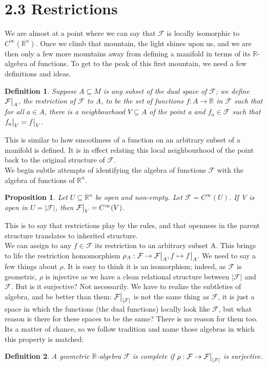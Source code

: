 \documentclass[12pt]{extarticle}
\newcommand\Reals{{\mathbb{R}}}
\newcommand{\ff}{\mathcal{F}}
\newcommand\restr[2]{{%
  \left.\kern-\nulldelimiterspace %
  #1 %
  \vphantom{\big|} %
  \right|_{#2} %
  }}
\newtheorem{definition}{Definition}
\newtheorem{proposition}[theorem]{Proposition}
\begin{document}
\section*{2.3 Restrictions}
We are almost at a point where we can say that $\ff$ is locally isomorphic to $C^\infty(\Reals^n)$. Once we climb that mountain, the light shines upon us, and we are then only a few more mountains away from defining a manifold in terms of its $\Reals$-algebra of functions. To get to the peak of this first mountain, we need a few definitions and ideas.
\begin{definition}
Suppose $A\subseteq M$ is any subset of the dual space of $\ff$;  we define
$\restr{\ff}{A}$, the \textit{restriction} of $\ff$ to A, to be the set of functions $f:A\to\Reals$ in $\ff$ such that for all $a\in A$, there is a neighbourhood $V\subseteq A$ of the point a and $f_a\in\ff$ such that $\restr{f_a}{V}=\restr{f}{V}$.
\end{definition}
This is similar to how smoothness of a function on an arbitrary subset of a manifold is defined. It is in effect relating this local neighbourhood of the point back to the original structure of $\ff$.\\
We begin subtle attempts of identifying the algebra of functions $\ff$ with the algebra of functions of $\Reals^n$.
\begin{proposition}
Let $U\subseteq\Reals^n$ be open and non-empty. Let $\ff = C^\infty(U)$. If V is open in $U=|\ff|$, then $\restr{\ff}{V}=C^\infty(V)$.
\end{proposition}
This is to say that restrictions play by the rules, and that openness in the parent structure translates to inherited structure.\\
We can assign to any $f\in\ff$ its restriction to an arbitrary subset A. This brings to life the restriction homomorphism $\rho_A:\ff\to\restr{\ff}{A}, f\mapsto\restr{f}{A}$. We need to say a few things about $\rho$. It is easy to think it is an isomorphism; indeed, as $\ff$ is geometric, $\rho$ is injective as we have a clean relational structure between $|\ff|$ and $\ff$. But is it surjective? Not necessarily. We have to realize the subtleties of algebra, and be better than them: $\restr{\ff}{|\ff|}$ is not the same thing as $\ff$, it is just a space in which the functions (the dual functions) locally look like $\ff$, but what reason is there for these spaces to be the same? There is no reason for them too. Its a matter of chance, so we follow tradition and name those algebras in which this property is matched:
\begin{definition}
A geometric $\Reals$-algebra $\ff$ is \textit{complete} if $\rho:\ff\to\restr{\ff}{|\ff|}$ is surjective.
\end{definition}
\end{document}
